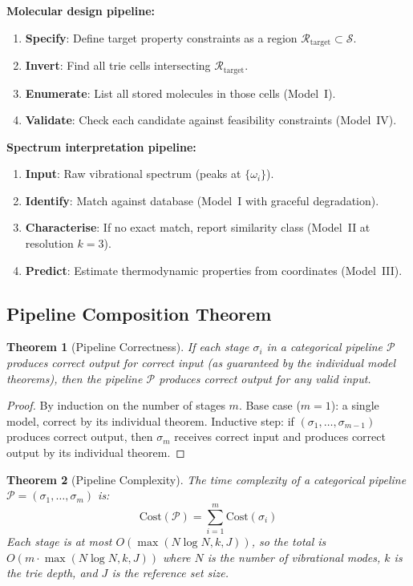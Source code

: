 \documentclass[11pt,twocolumn,a4paper]{article}
\newtheorem{theorem}{Theorem}[section]
\theoremstyle{definition}
\theoremstyle{remark}
\newcommand{\Sspace}{\mathcal{S}}
\newcommand{\Pipeline}{\mathcal{P}}
\begin{document}
\textbf{Molecular design pipeline:}
\begin{enumerate}[nosep]
\item \textbf{Specify}: Define target property constraints as a region $\mathcal{R}_{\mathrm{target}} \subset \Sspace$.
\item \textbf{Invert}: Find all trie cells intersecting $\mathcal{R}_{\mathrm{target}}$.
\item \textbf{Enumerate}: List all stored molecules in those cells (Model~I).
\item \textbf{Validate}: Check each candidate against feasibility constraints (Model~IV).
\end{enumerate}

\textbf{Spectrum interpretation pipeline:}
\begin{enumerate}[nosep]
\item \textbf{Input}: Raw vibrational spectrum (peaks at $\{\omega_i\}$).
\item \textbf{Identify}: Match against database (Model~I with graceful degradation).
\item \textbf{Characterise}: If no exact match, report similarity class (Model~II at resolution $k=3$).
\item \textbf{Predict}: Estimate thermodynamic properties from coordinates (Model~III).
\end{enumerate}

\subsection{Pipeline Composition Theorem}

\begin{theorem}[Pipeline Correctness]
\label{thm:pipeline_correct}
If each stage $\sigma_i$ in a categorical pipeline $\Pipeline$ produces correct output for correct input (as guaranteed by the individual model theorems), then the pipeline $\Pipeline$ produces correct output for any valid input.
\end{theorem}

\begin{proof}
By induction on the number of stages $m$. Base case ($m = 1$): a single model, correct by its individual theorem. Inductive step: if $(\sigma_1, \ldots, \sigma_{m-1})$ produces correct output, then $\sigma_m$ receives correct input and produces correct output by its individual theorem.
\end{proof}

\begin{theorem}[Pipeline Complexity]
\label{thm:pipeline_complexity}
The time complexity of a categorical pipeline $\Pipeline = (\sigma_1, \ldots, \sigma_m)$ is:
\begin{equation}
\text{Cost}(\Pipeline) = \sum_{i=1}^{m} \text{Cost}(\sigma_i)
\label{eq:pipeline_cost}
\end{equation}
Each stage is at most $O(\max(N \log N, k, J))$, so the total is $O(m \cdot \max(N \log N, k, J))$ where $N$ is the number of vibrational modes, $k$ is the trie depth, and $J$ is the reference set size.
\end{theorem}
\end{document}
